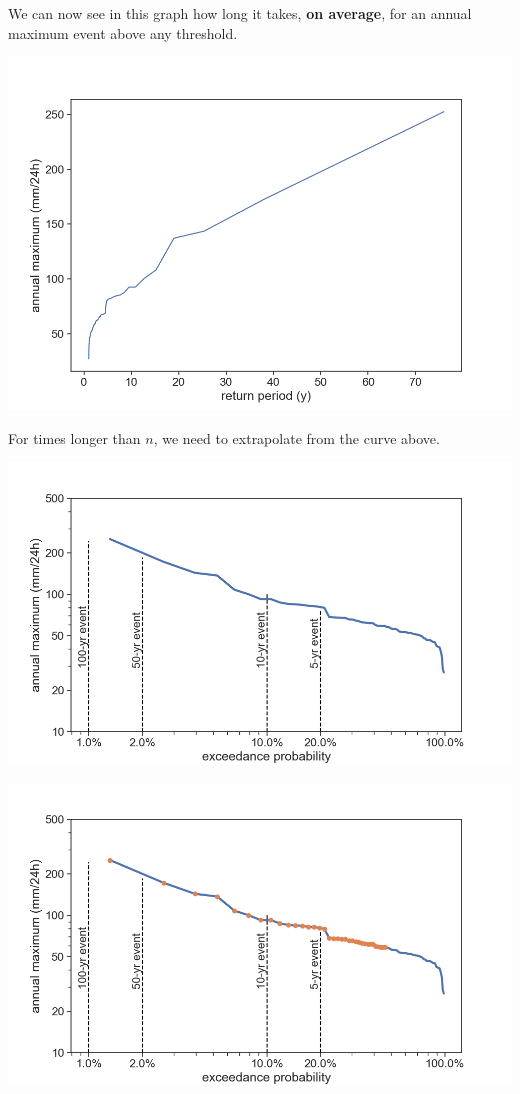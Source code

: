 \documentclass[
  letterpaper,
  DIV=11,
  numbers=noendperiod]{scrreprt}
\begin{document}
We can now see in this graph how long it takes, \textbf{on average}, for
an annual maximum event above any threshold.

\includegraphics{archive/figures/annual_max_vs_return_period.png}

For times longer than \(n\), we need to extrapolate from the curve
above.

\includegraphics{archive/figures/extrapolation_exceedance1.png}

\includegraphics{archive/figures/extrapolation_exceedance2.png}
\end{document}
